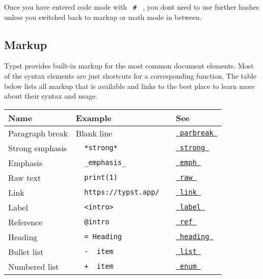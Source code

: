 Once you have entered code mode with \texttt{\ \#\ } , you
don\textquotesingle t need to use further hashes unless you switched
back to markup or math mode in between.

\subsection{Markup}\label{markup}

Typst provides built-in markup for the most common document elements.
Most of the syntax elements are just shortcuts for a corresponding
function. The table below lists all markup that is available and links
to the best place to learn more about their syntax and usage.

\begin{longtable}[]{@{}lll@{}}
\toprule\noalign{}
Name & Example & See \\
\midrule\noalign{}
\endhead
\bottomrule\noalign{}
\endlastfoot
Paragraph break & Blank line &
\href{/docs/reference/model/parbreak/}{\texttt{\ parbreak\ }} \\
Strong emphasis & \texttt{\ }{\texttt{\ *strong*\ }}\texttt{\ } &
\href{/docs/reference/model/strong/}{\texttt{\ strong\ }} \\
Emphasis & \texttt{\ }{\texttt{\ \_emphasis\_\ }}\texttt{\ } &
\href{/docs/reference/model/emph/}{\texttt{\ emph\ }} \\
Raw text &
\texttt{\ }{\texttt{\ \textasciigrave{}print(1)\textasciigrave{}\ }}\texttt{\ }
& \href{/docs/reference/text/raw/}{\texttt{\ raw\ }} \\
Link & \texttt{\ }{\texttt{\ https://typst.app/\ }}\texttt{\ } &
\href{/docs/reference/model/link/}{\texttt{\ link\ }} \\
Label &
\texttt{\ }{\texttt{\ \textless{}intro\textgreater{}\ }}\texttt{\ } &
\href{/docs/reference/foundations/label/}{\texttt{\ label\ }} \\
Reference & \texttt{\ }{\texttt{\ @intro\ }}\texttt{\ } &
\href{/docs/reference/model/ref/}{\texttt{\ ref\ }} \\
Heading & \texttt{\ }{\texttt{\ =\ Heading\ }}\texttt{\ } &
\href{/docs/reference/model/heading/}{\texttt{\ heading\ }} \\
Bullet list & \texttt{\ }{\texttt{\ -\ }}\texttt{\ item\ } &
\href{/docs/reference/model/list/}{\texttt{\ list\ }} \\
Numbered list & \texttt{\ }{\texttt{\ +\ }}\texttt{\ item\ } &
\href{/docs/reference/model/enum/}{\texttt{\ enum\ }} \\

\end{longtable}
